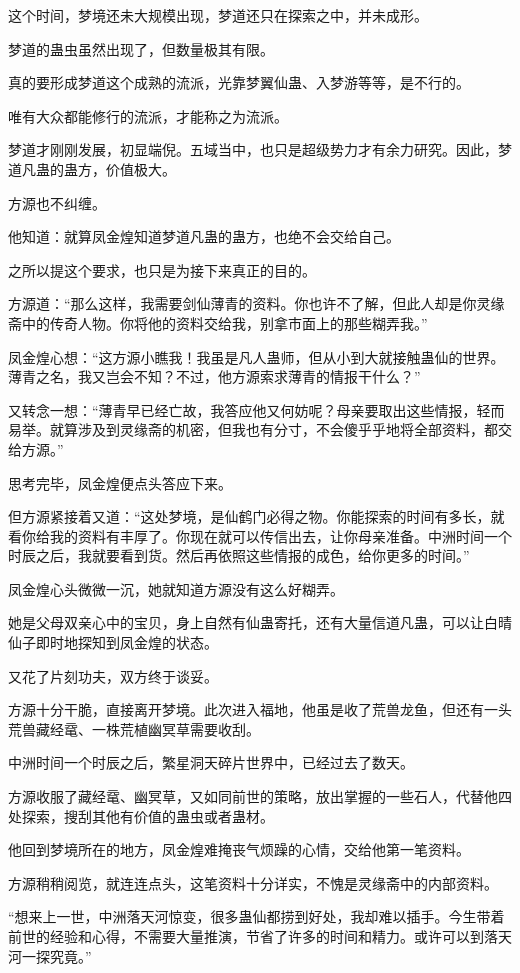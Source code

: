\begin{this_body}
这个时间，梦境还未大规模出现，梦道还只在探索之中，并未成形。

梦道的蛊虫虽然出现了，但数量极其有限。

真的要形成梦道这个成熟的流派，光靠梦翼仙蛊、入梦游等等，是不行的。

唯有大众都能修行的流派，才能称之为流派。

梦道才刚刚发展，初显端倪。五域当中，也只是超级势力才有余力研究。因此，梦道凡蛊的蛊方，价值极大。

方源也不纠缠。

他知道：就算凤金煌知道梦道凡蛊的蛊方，也绝不会交给自己。

之所以提这个要求，也只是为接下来真正的目的。

方源道：“那么这样，我需要剑仙薄青的资料。你也许不了解，但此人却是你灵缘斋中的传奇人物。你将他的资料交给我，别拿市面上的那些糊弄我。”

凤金煌心想：“这方源小瞧我！我虽是凡人蛊师，但从小到大就接触蛊仙的世界。薄青之名，我又岂会不知？不过，他方源索求薄青的情报干什么？”

又转念一想：“薄青早已经亡故，我答应他又何妨呢？母亲要取出这些情报，轻而易举。就算涉及到灵缘斋的机密，但我也有分寸，不会傻乎乎地将全部资料，都交给方源。”

思考完毕，凤金煌便点头答应下来。

但方源紧接着又道：“这处梦境，是仙鹤门必得之物。你能探索的时间有多长，就看你给我的资料有丰厚了。你现在就可以传信出去，让你母亲准备。中洲时间一个时辰之后，我就要看到货。然后再依照这些情报的成色，给你更多的时间。”

凤金煌心头微微一沉，她就知道方源没有这么好糊弄。

她是父母双亲心中的宝贝，身上自然有仙蛊寄托，还有大量信道凡蛊，可以让白晴仙子即时地探知到凤金煌的状态。

又花了片刻功夫，双方终于谈妥。

方源十分干脆，直接离开梦境。此次进入福地，他虽是收了荒兽龙鱼，但还有一头荒兽藏经鼋、一株荒植幽冥草需要收刮。

中洲时间一个时辰之后，繁星洞天碎片世界中，已经过去了数天。

方源收服了藏经鼋、幽冥草，又如同前世的策略，放出掌握的一些石人，代替他四处探索，搜刮其他有价值的蛊虫或者蛊材。

他回到梦境所在的地方，凤金煌难掩丧气烦躁的心情，交给他第一笔资料。

方源稍稍阅览，就连连点头，这笔资料十分详实，不愧是灵缘斋中的内部资料。

“想来上一世，中洲落天河惊变，很多蛊仙都捞到好处，我却难以插手。今生带着前世的经验和心得，不需要大量推演，节省了许多的时间和精力。或许可以到落天河一探究竟。”


\end{this_body}
